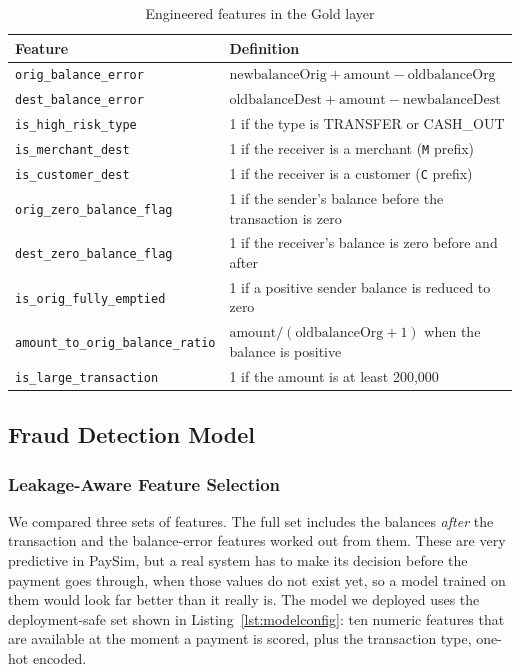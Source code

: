\documentclass[11pt,a4paper]{article}
\newcommand{\code}[1]{\texttt{#1}}
\begin{document}
\begin{table}[H]
\centering
\caption{Engineered features in the Gold layer}
\label{tab:features}
\begin{tabularx}{\linewidth}{lL}
\toprule
Feature & Definition \\
\midrule
\code{orig\_balance\_error} & $\text{newbalanceOrig} + \text{amount} - \text{oldbalanceOrg}$ \\
\code{dest\_balance\_error} & $\text{oldbalanceDest} + \text{amount} - \text{newbalanceDest}$ \\
\code{is\_high\_risk\_type} & 1 if the type is TRANSFER or CASH\_OUT \\
\code{is\_merchant\_dest} & 1 if the receiver is a merchant (\code{M} prefix) \\
\code{is\_customer\_dest} & 1 if the receiver is a customer (\code{C} prefix) \\
\code{orig\_zero\_balance\_flag} & 1 if the sender's balance before the transaction is zero \\
\code{dest\_zero\_balance\_flag} & 1 if the receiver's balance is zero before and after \\
\code{is\_orig\_fully\_emptied} & 1 if a positive sender balance is reduced to zero \\
\code{amount\_to\_orig\_balance\_ratio} & $\text{amount} / (\text{oldbalanceOrg} + 1)$ when the balance is positive \\
\code{is\_large\_transaction} & 1 if the amount is at least 200,000 \\
\bottomrule
\end{tabularx}
\end{table}

\subsection{Fraud Detection Model}

\subsubsection{Leakage-Aware Feature Selection}
We compared three sets of features. The full set includes the balances
\emph{after} the transaction and the balance-error features worked out from
them. These are very predictive in PaySim, but a real system has to make its
decision before the payment goes through, when those values do not exist yet, so
a model trained on them would look far better than it really is. The model we
deployed uses the deployment-safe set shown in Listing~\ref{lst:modelconfig}: ten
numeric features that are available at the moment a payment is scored, plus the
transaction type, one-hot encoded.
\end{document}
